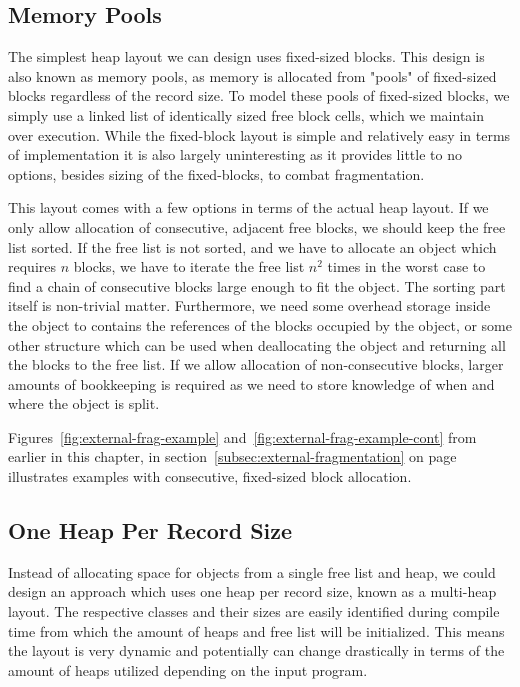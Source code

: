 \subsection{Memory Pools}
\label{subsec:memory-pools}
The simplest heap layout we can design uses fixed-sized blocks. This design is also known as memory pools, as memory is allocated from "pools" of fixed-sized blocks regardless of the record size.
To model these pools of fixed-sized blocks, we simply use a linked list of identically sized free block cells, which we maintain over execution.
While the fixed-block layout is simple and relatively easy in terms of implementation it is also largely uninteresting as it provides little to no options, besides sizing of the fixed-blocks, to combat fragmentation.

This layout comes with a few options in terms of the actual heap layout. If we only allow allocation of consecutive, adjacent free blocks, we should keep the free list sorted. If the free list is not sorted, and we have to allocate an object which requires $n$ blocks, we have to iterate the free list $n^2$ times in the worst case to find a chain of consecutive blocks large enough to fit the object. The sorting part itself is non-trivial matter. Furthermore, we need some overhead storage inside the object to contains the references of the blocks occupied by the object, or some other structure which can be used when deallocating the object and returning all the blocks to the free list. If we allow allocation of non-consecutive blocks, larger amounts of bookkeeping is required as we need to store knowledge of when and where the object is split.

Figures~\ref{fig:external-frag-example} and~\ref{fig:external-frag-example-cont} from earlier in this chapter, in section~\ref{subsec:external-fragmentation} on page~\pageref{fig:external-frag-example} illustrates examples with consecutive, fixed-sized block allocation. 


\subsection{One Heap Per Record Size}
\label{subsec:one-heap-per-record-size}
Instead of allocating space for objects from a single free list and heap, we could design an approach which uses one heap per record size, known as a multi-heap layout. The respective classes and their sizes are easily identified during compile time from which the amount of heaps and free list will be initialized. This means the layout is very dynamic and potentially can change drastically in terms of the amount of heaps utilized depending on the input program. 

